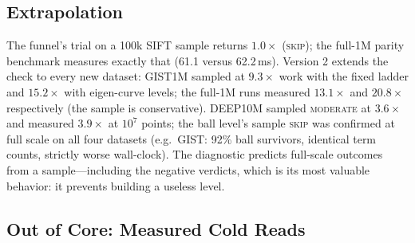 \documentclass[sigconf,nonacm]{acmart}
\begin{document}
\subsection{Extrapolation}

The funnel's trial on a 100k SIFT sample returns $1.0\times$
(\textsc{skip}); the full-1M parity benchmark measures exactly that (61.1
versus 62.2\,ms). Version 2 extends the check to every new dataset: GIST1M
sampled at $9.3\times$ work with the fixed ladder and $15.2\times$ with
eigen-curve levels; the full-1M runs measured $13.1\times$ and
$20.8\times$ respectively (the sample is conservative). DEEP10M sampled
\textsc{moderate} at $3.6\times$
and measured $3.9\times$ at $10^7$ points; the ball level's sample
\textsc{skip} was confirmed at full scale on all four datasets
(e.g.\ GIST: 92\% ball survivors, identical term counts, strictly worse
wall-clock). The diagnostic predicts full-scale outcomes from a
sample---including the negative verdicts, which is its most valuable
behavior: it prevents building a useless level.

\subsection{Out of Core: Measured Cold Reads}
\label{sec:ooc}
\end{document}
